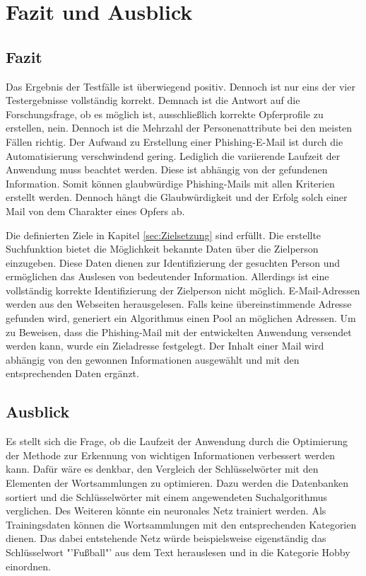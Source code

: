 \chapter{Fazit und Ausblick}
\label{chap:SchlussUndAusblick}
\section{Fazit}
Das Ergebnis der Testfälle ist überwiegend positiv. Dennoch ist nur eins der vier Testergebnisse vollständig korrekt. Demnach ist die Antwort auf die Forschungsfrage, ob es möglich ist, ausschließlich korrekte Opferprofile zu erstellen, nein. Dennoch ist die Mehrzahl der Personenattribute bei den meisten Fällen richtig. Der Aufwand zu Erstellung einer Phishing-E-Mail ist durch die Automatisierung verschwindend gering. Lediglich die variierende Laufzeit der Anwendung muss beachtet werden. Diese ist abhängig von der gefundenen Information. Somit können glaubwürdige Phishing-Mails mit allen Kriterien erstellt werden. Dennoch hängt die Glaubwürdigkeit und der Erfolg solch einer Mail von dem Charakter eines Opfers ab.

Die definierten Ziele in Kapitel \ref{sec:Zielsetzung} sind erfüllt. Die erstellte Suchfunktion bietet die Möglichkeit bekannte Daten über die Zielperson einzugeben. Diese Daten dienen zur Identifizierung der gesuchten Person und ermöglichen das Auslesen von bedeutender Information. Allerdings ist eine vollständig korrekte Identifizierung der Zielperson nicht möglich. E-Mail-Adressen werden aus den Webseiten herausgelesen. Falls keine übereinstimmende Adresse gefunden wird, generiert ein Algorithmus einen Pool an möglichen Adressen. Um zu Beweisen, dass die Phishing-Mail mit der entwickelten Anwendung versendet werden kann, wurde ein Zieladresse festgelegt. Der Inhalt einer Mail wird abhängig von den gewonnen Informationen ausgewählt und mit den entsprechenden Daten ergänzt.

\section{Ausblick}
Es stellt sich die Frage, ob die Laufzeit der Anwendung durch die Optimierung der Methode zur Erkennung von wichtigen Informationen verbessert werden kann. Dafür wäre es denkbar, den Vergleich der Schlüsselwörter mit den Elementen der Wortsammlungen zu optimieren. Dazu werden die Datenbanken sortiert und die Schlüsselwörter mit einem angewendeten Suchalgorithmus verglichen. Des Weiteren könnte ein neuronales Netz trainiert werden. Als Trainingsdaten können die Wortsammlungen mit den entsprechenden Kategorien dienen. Das dabei entstehende Netz würde beispielsweise eigenständig das Schlüsselwort "'Fußball"' aus dem Text herauslesen und in die Kategorie Hobby einordnen. 

